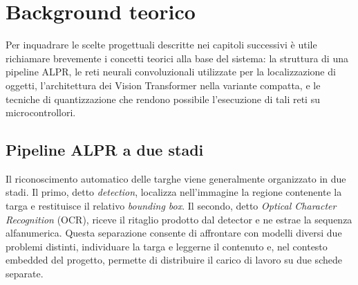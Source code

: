 \chapter{Background teorico}
\label{cap:background}

Per inquadrare le scelte progettuali descritte nei capitoli successivi è utile richiamare brevemente i concetti teorici alla base del sistema: la struttura di una pipeline ALPR, le reti neurali convoluzionali utilizzate per la localizzazione di oggetti, l'architettura dei Vision Transformer nella variante compatta, e le tecniche di quantizzazione che rendono possibile l'esecuzione di tali reti su microcontrollori.

\section{Pipeline ALPR a due stadi}
\label{sec:alpr-pipeline}

Il riconoscimento automatico delle targhe viene generalmente organizzato in due stadi. Il primo, detto \textit{detection}, localizza nell'immagine la regione contenente la targa e restituisce il relativo \textit{bounding box}. Il secondo, detto \textit{Optical Character Recognition} (OCR), riceve il ritaglio prodotto dal detector e ne estrae la sequenza alfanumerica. Questa separazione consente di affrontare con modelli diversi due problemi distinti, individuare la targa e leggerne il contenuto e, nel contesto embedded del progetto, permette di distribuire il carico di lavoro su due schede separate.


